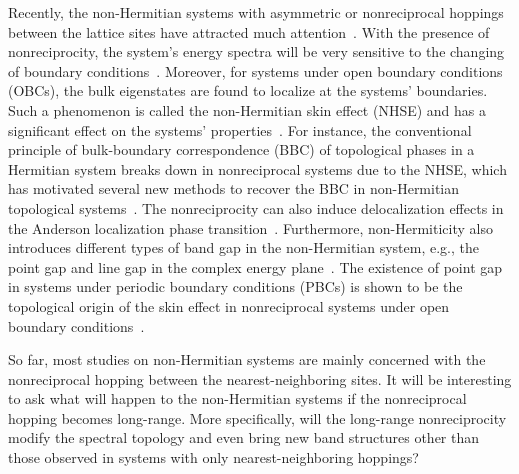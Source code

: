 \documentclass[prb,aps,twocolumn,showpacs]{revtex4-2} %
\begin{document}
Recently, the non-Hermitian systems with asymmetric or nonreciprocal hoppings between the lattice sites have attracted much attention~\cite{Lee2016PRL,Lieu2018PRB,Yin2018PRA}. With the presence of nonreciprocity, the system's energy spectra will be very sensitive to the changing of boundary conditions~\cite{Xiong2018JPC}. Moreover, for systems under open boundary conditions (OBCs), the bulk eigenstates are found to localize at the systems' boundaries. Such a phenomenon is called the non-Hermitian skin effect (NHSE) and has a significant effect on the systems' properties~\cite{Shen2018PRL,Yao2018PRL1,Yao2018PRL2,Alvarez2018PRB,Alvarez2018EPJ,Lee2019PRB,Zhou2019PRB,Kawabata2019PRX,Okuma2020PRB,Xiao2020NatPhys,Yoshida2020PRR,Longhi2019PRR,Yi2020PRL}. For instance, the conventional principle of bulk-boundary correspondence (BBC) of topological phases in a Hermitian system breaks down in nonreciprocal systems due to the NHSE, which has motivated several new methods to recover the BBC in non-Hermitian topological systems~\cite{Yao2018PRL1,Yao2018PRL2,Kunst2018PRL,Jin2019PRB,Yokomizo2019PRL,Herviou2019PRA,Yang2020PRL2,Zirnstein2021PRL,Zhang2022arxiv}. The nonreciprocity can also induce delocalization effects in the Anderson localization phase transition~\cite{Hatano1996PRL,Shnerb1998PRL,Gong2018PRX,Jiang2019PRB,Zeng2020PRR,Liu2021PRB1,Liu2021PRB2}. Furthermore, non-Hermiticity also introduces different types of band gap in the non-Hermitian system, e.g., the point gap and line gap in the complex energy plane~\cite{Gong2018PRX,Kawabata2019PRX}. The existence of point gap in systems under periodic boundary conditions (PBCs) is shown to be the topological origin of the skin effect in nonreciprocal systems under open boundary conditions~\cite{Borgnia2020PRL,Okuma2020PRL,Zhang2020PRL}. 

So far, most studies on non-Hermitian systems are mainly concerned with the nonreciprocal hopping between the nearest-neighboring sites. It will be interesting to ask what will happen to the non-Hermitian systems if the nonreciprocal hopping becomes long-range. More specifically, will the long-range nonreciprocity modify the spectral topology and even bring new band structures other than those observed in systems with only nearest-neighboring hoppings?   
\end{document}

